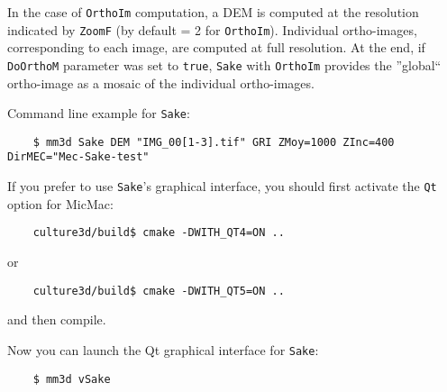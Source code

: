 \vspace*{0.3cm}
In the case of {\tt OrthoIm} computation, a DEM is computed at the resolution indicated by {\tt ZoomF} (by default = 2 for {\tt OrthoIm}). Individual ortho-images, corresponding to each image, are computed at full resolution. At the end, if {\tt DoOrthoM} parameter was set to {\tt true}, {\tt Sake} with {\tt OrthoIm} provides the ''global`` ortho-image as a mosaic of the individual ortho-images.


\vspace*{0.3cm}
Command line example for {\tt Sake}:
\begin{verbatim}
    $ mm3d Sake DEM "IMG_00[1-3].tif" GRI ZMoy=1000 ZInc=400 DirMEC="Mec-Sake-test"
\end{verbatim}

If you prefer to use {\tt Sake}'s graphical interface, you should first activate the {\tt Qt} option for MicMac:
  \begin{verbatim}
    culture3d/build$ cmake -DWITH_QT4=ON ..
  \end{verbatim}
  or
  \begin{verbatim}
    culture3d/build$ cmake -DWITH_QT5=ON ..
  \end{verbatim}
  and then compile.

\vspace{0.5cm}
Now you can launch the Qt graphical interface for {\tt Sake}:
\begin{verbatim}
    $ mm3d vSake
\end{verbatim}








